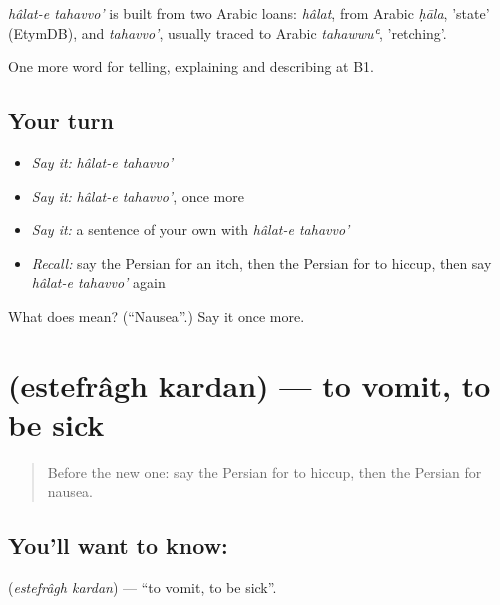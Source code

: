 \begin{cousinweb}
\emph{hâlat-e tahavvo'} is built from two Arabic loans: \emph{hâlat}, from Arabic \emph{ḥāla}, 'state' (EtymDB), and \emph{tahavvo'}, usually traced to Arabic \emph{tahawwuʿ}, 'retching'.
\end{cousinweb}

\begin{grammarlens}[title={What you've built}]
One more word for telling, explaining and describing at B1.
\end{grammarlens}

\subsection*{Your turn}
\begin{itemize}
\raggedright
  \item \emph{Say it:} \emph{hâlat-e tahavvo'}
  \item \emph{Say it:} \emph{hâlat-e tahavvo'}, once more
  \item \emph{Say it:} a sentence of your own with \emph{hâlat-e tahavvo'}
  \item \emph{Recall:} say the Persian for an itch, then the Persian for to hiccup, then say \emph{hâlat-e tahavvo'} again
\end{itemize}

\begin{tcolorbox}[breakable,colback=teal!4,colframe=teal!35!black,title={Before you move on}]
What does   mean? (\textquotedblleft{}Nausea\textquotedblright{}.) Say it once more.
\end{tcolorbox}
\section[\texorpdfstring{\fa{استفراغ} \fa{کردن} (estefrâgh kardan)}{استفراغ کردن (estefrâgh kardan)}]{  (estefrâgh kardan) — to vomit, to be sick}

\label{lesson:FA-C492-estefragh-kardan}



\begin{quote}
Before the new one: say the Persian for to hiccup, then the Persian for nausea.
\end{quote}

\subsection*{You'll want to know:  }
\textbf{ } (\emph{estefrâgh kardan}) — \textquotedblleft{}to vomit, to be sick\textquotedblright{}.

